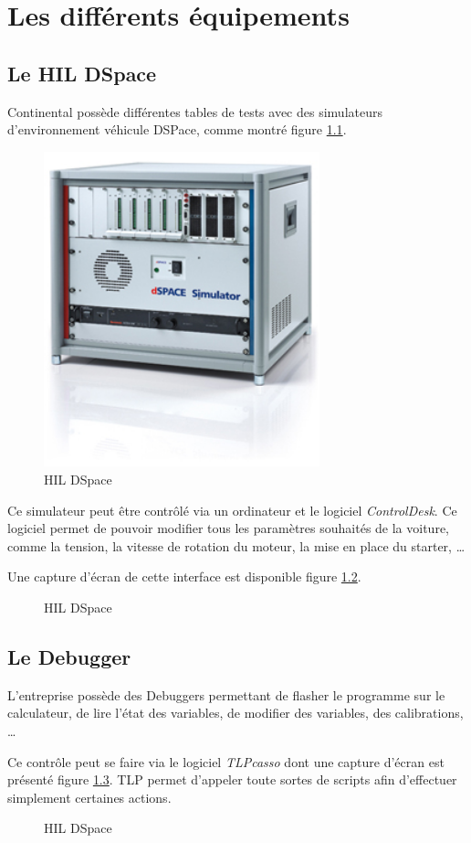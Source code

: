 \chapter{Les différents équipements}\label{devices}
\section{Le HIL DSpace}
Continental possède différentes tables de tests avec des simulateurs d'environnement véhicule DSPace, comme montré figure \ref{fig:dspace}.
\begin{figure}[H]
	\centering
	\includegraphics[width=8cm]{contents/images/hil.jpg}
	\caption{HIL DSpace}
	\label{fig:dspace}
\end{figure}

Ce simulateur peut être contrôlé via un ordinateur et le logiciel \textit{ControlDesk}. Ce logiciel permet de pouvoir modifier tous les
paramètres souhaités de la voiture, comme la tension, la vitesse de rotation du moteur, la mise en place du starter, \ldots

Une capture d'écran de cette interface est disponible figure \ref{fig:controldesk}.

\begin{figure}[H]
	\centering
	\caption{HIL DSpace}
	\label{fig:controldesk}
\end{figure}

\section{Le Debugger}
L'entreprise possède des Debuggers permettant de flasher le programme sur le calculateur, de lire l'état des variables, de modifier des
variables, des calibrations, \ldots

Ce contrôle peut se faire via le logiciel \textit{TLPcasso} dont une capture d'écran est présenté figure \ref{fig:tlp}. TLP permet d'appeler
toute sortes de scripts afin d'effectuer simplement certaines actions.

\begin{figure}[H]
	\centering
	\caption{HIL DSpace}
	\label{fig:tlp}
\end{figure}

